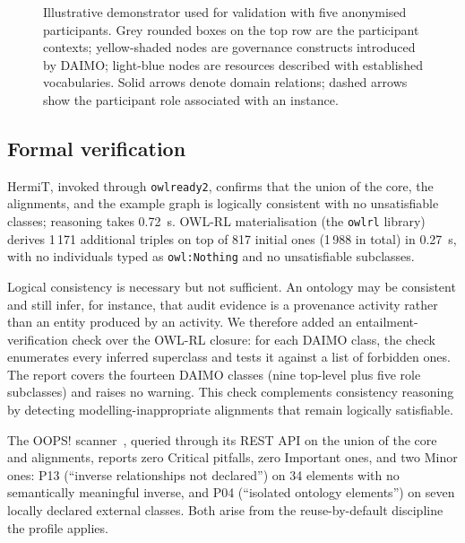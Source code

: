 \documentclass[Afour,sagev,times]{sagej}
\newcommand{\code}[1]{\texttt{#1}}
\begin{document}
\begin{figure}[t]
\caption{Illustrative demonstrator used for validation with five anonymised participants. Grey rounded boxes on the top row are the participant contexts; yellow-shaded nodes are governance constructs introduced by DAIMO; light-blue nodes are resources described with established vocabularies. Solid arrows denote domain relations; dashed arrows show the participant role associated with an instance.}
\label{fig:scenario}
\end{figure}

\subsection{Formal verification}\label{sec:eval-engineering}

HermiT, invoked through \code{owlready2}, confirms that the union of the core, the alignments, and the example graph is logically consistent with no unsatisfiable classes; reasoning takes 0.72~s. OWL-RL materialisation (the \code{owlrl} library) derives 1\,171 additional triples on top of 817 initial ones (1\,988 in total) in 0.27~s, with no individuals typed as \code{owl:Nothing} and no unsatisfiable subclasses.

Logical consistency is necessary but not sufficient. An ontology may be consistent and still infer, for instance, that audit evidence is a provenance activity rather than an entity produced by an activity. We therefore added an entailment-verification check over the OWL-RL closure: for each DAIMO class, the check enumerates every inferred superclass and tests it against a list of forbidden ones. The report covers the fourteen DAIMO classes (nine top-level plus five role subclasses) and raises no warning. This check complements consistency reasoning by detecting modelling-inappropriate alignments that remain logically satisfiable.

The OOPS! scanner~\cite{oops14}, queried through its REST API on the union of the core and alignments, reports zero Critical pitfalls, zero Important ones, and two Minor ones: P13 (``inverse relationships not declared'') on 34 elements with no semantically meaningful inverse, and P04 (``isolated ontology elements'') on seven locally declared external classes. Both arise from the reuse-by-default discipline the profile applies.
\end{document}
